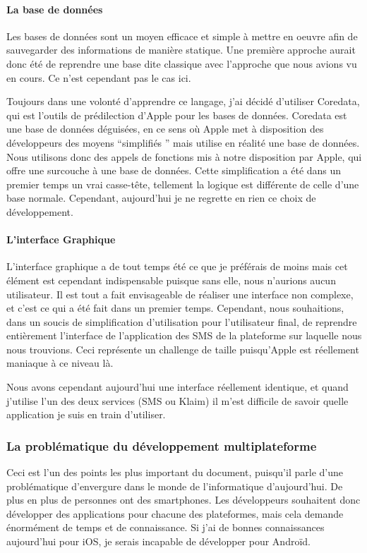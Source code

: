 \documentclass{article}
\begin{document}
		\paragraph{La base de données}
		Les bases de données sont un moyen efficace et simple à mettre en oeuvre afin de sauvegarder des informations de manière statique. Une première approche aurait donc été de reprendre une base dite classique avec l'approche que nous avions vu en cours. Ce n'est cependant pas le cas ici.
		
		Toujours dans une volonté d'apprendre ce langage, j'ai décidé d'utiliser Coredata, qui est l'outils de prédilection d'Apple pour les bases de données. Coredata est une base de données déguisées, en ce sens où Apple met à disposition des développeurs des moyens ``simplifiés '' mais utilise en réalité une base de données. Nous utilisons donc des appels de fonctions mis à notre disposition par Apple, qui offre une surcouche à une base de données. Cette simplification a été dans un premier temps un vrai casse-tête, tellement la logique est différente de celle d'une base normale. Cependant, aujourd'hui je ne regrette en rien ce choix de développement.
		
		\paragraph{L'interface Graphique}
		L'interface graphique a de tout temps été ce que je préférais de moins mais cet élément est cependant indispensable puisque sans elle, nous n'aurions aucun utilisateur. Il est tout a fait envisageable de réaliser une interface non complexe, et c'est ce qui a été fait dans un premier temps. Cependant, nous souhaitions, dans un soucis de simplification d'utilisation pour l'utilisateur final, de reprendre entièrement l'interface de l'application des SMS de la plateforme sur laquelle nous nous trouvions. Ceci représente un challenge de taille puisqu'Apple est réellement maniaque à ce niveau là. 
		
		Nous avons cependant aujourd'hui une interface réellement identique, et quand j'utilise l'un des deux services (SMS ou Klaim) il m'est difficile de savoir quelle application je suis en train d'utiliser.
		
\subsubsection{La problématique du développement multiplateforme}
		Ceci est l'un des points les plus important du document, puisqu'il parle d'une problématique d'envergure dans le monde de l'informatique d'aujourd'hui. De plus en plus de personnes ont des smartphones. Les développeurs souhaitent donc développer des applications pour chacune des plateformes, mais cela demande énormément de temps et de connaissance. Si j'ai de bonnes connaissances aujourd'hui pour iOS, je serais incapable de développer pour Androïd.
\end{document}
